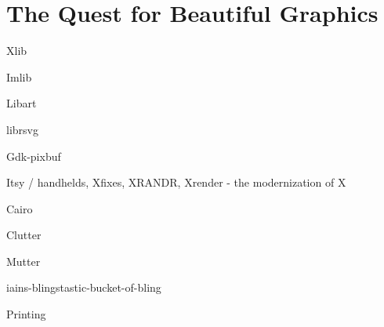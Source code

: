 \chapter{The Quest for Beautiful Graphics}

Xlib

Imlib

Libart

librsvg

Gdk-pixbuf

Itsy / handhelds, Xfixes, XRANDR, Xrender - the modernization of X

Cairo

Clutter

Mutter

iains-blingstastic-bucket-of-bling

Printing
